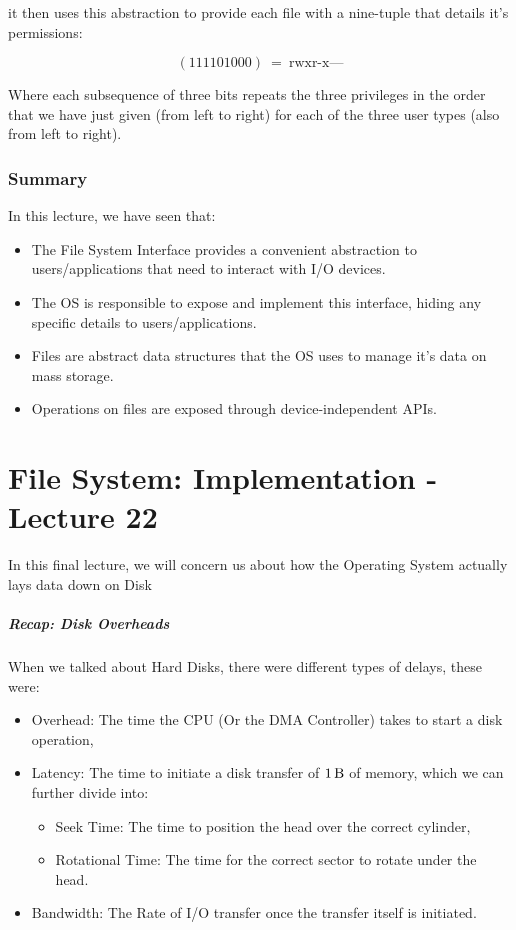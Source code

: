 \documentclass[openright, twoside]{report}
\theoremstyle{definition}
\theoremstyle{example}
\begin{document}
it then uses this abstraction to provide each file with a 
nine-tuple that details it's permissions:

\[
	(111101000)\ =\ \text{rwxr-x---}
\]

Where each subsequence of three bits repeats the three privileges in the 
order that we have just given (from left to right) for each of the three
user types (also from left to right).

\subsection{Summary}
In this lecture, we have seen that:

\begin{itemize}
	\item The File System Interface provides a convenient abstraction to 
	users/applications that need to interact with I/O devices.
	\item The OS is responsible to expose and implement this interface, hiding 
	any specific details to users/applications.
	\item Files are abstract data structures that the OS uses to manage 
	it's data on mass storage.
	\item Operations on files are exposed through device-independent APIs.
\end{itemize}

\chapter{File System: Implementation - Lecture 22}
In this final lecture, we will concern us about how the Operating System 
actually lays data down on Disk

\paragraph{Recap: Disk Overheads}
When we talked about Hard Disks, there were different types of delays, these 
were:

\begin{itemize}
	\item Overhead: The time the CPU (Or the DMA Controller) takes to start 
	a disk operation,
	\item Latency: The time to initiate a disk transfer of $\SI{1}{\byte}$ of memory,
	which we can further divide into:
	\begin{itemize}
		\item Seek Time: The time to position the head over the correct cylinder,
		\item Rotational Time: The time for the correct sector to rotate under the head.
	\end{itemize}
	\item Bandwidth: The Rate of I/O transfer once the transfer itself is initiated.
\end{itemize}
\end{document}
